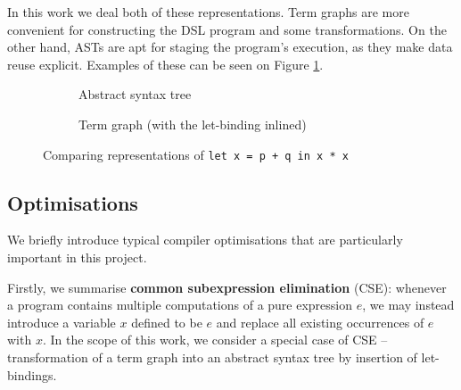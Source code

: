 In this work we deal both of these representations. Term graphs are more convenient for constructing the DSL program and some transformations. On the other hand, ASTs are apt for staging the program's execution, as they make data reuse explicit. Examples of these can be seen on Figure \ref{fig:term-repr}.

\begin{figure}[ht]
\centering
\begin{subfigure}{.4\textwidth}
  \centering
{}
  \caption{Abstract syntax tree}
\end{subfigure}%
\begin{subfigure}{.4\textwidth}
  \centering
{}
  \caption{Term graph (with the let-binding inlined)}
\end{subfigure}
\caption{Comparing representations of \texttt{let x = p + q in x * x}}
\label{fig:term-repr}
\end{figure}


\subsection{Optimisations} \label{general-optimisations}

We briefly introduce typical compiler optimisations that are particularly important in this project.

Firstly, we summarise \textbf{common subexpression elimination} (CSE): whenever a program contains multiple computations of a pure expression $e$, we may instead introduce a variable $x$ defined to be $e$ and replace all existing occurrences of $e$ with $x$. 
In the scope of this work, we consider a special case of CSE -- transformation of a term graph into an abstract syntax tree by insertion of let-bindings.

